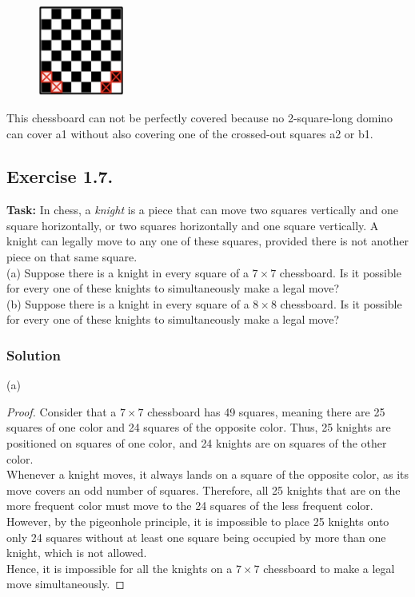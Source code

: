 \documentclass{article}
\begin{document}
\begin{figure}[htbp] \centering \includegraphics[width=0.25\textwidth]{images/1.6.jpg} %
\end{figure}

\noindent This chessboard can not be perfectly covered because no 2-square-long domino can cover a1 without also covering one of
the crossed-out squares a2 or b1.

\newpage

\subsection{Exercise 1.7.}
\textbf{Task:} In chess, a \textit{knight} is a piece that can move two squares vertically and one square horizontally, or two squares horizontally and one square vertically. A knight can legally move to any one of these squares, provided there is not another piece on that same square.\\

\noindent (a) Suppose there is a knight in every square of a $7 \times 7$ chessboard. Is it possible for every one of these knights to simultaneously make a legal move?\\

\noindent (b) Suppose there is a knight in every square of a $8 \times 8$ chessboard. Is it possible for every one of these knights to simultaneously make a legal move?

\subsubsection*{Solution}

(a) 

\begin{proof}
    Consider that a $7 \times 7$ chessboard has 49 squares, meaning there are 25 squares of one color and 24 squares of the opposite color. Thus, 25 knights are positioned on squares of one color, and 24 knights are on squares of the other color. \\
    Whenever a knight moves, it always lands on a square of the opposite color, as its move covers an odd number of squares. Therefore, all 25 knights that are on the more frequent color must move to the 24 squares of the less frequent color. \\
    However, by the pigeonhole principle, it is impossible to place 25 knights onto only 24 squares without at least one square being occupied by more than one knight, which is not allowed. \\
    Hence, it is impossible for all the knights on a $7 \times 7$ chessboard to make a legal move simultaneously.
\end{proof}
\end{document}

